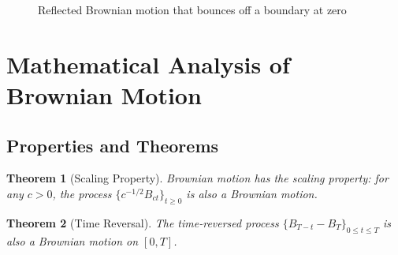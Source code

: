 \documentclass[12pt,a4paper,twoside]{article}
\newtheorem{theorem}{Theorem}[section]
\theoremstyle{definition}
\begin{document}
\begin{figure}[H]
\centering
{}
\caption{Reflected Brownian motion that bounces off a boundary at zero}
\label{fig:reflected-brownian}
\end{figure}

\section{Mathematical Analysis of Brownian Motion}

\subsection{Properties and Theorems}

\begin{theorem}[Scaling Property]
Brownian motion has the scaling property: for any $c > 0$, the process $\{c^{-1/2}B_{ct}\}_{t \geq 0}$ is also a Brownian motion.
\end{theorem}

\begin{theorem}[Time Reversal]
The time-reversed process $\{B_{T-t} - B_T\}_{0 \leq t \leq T}$ is also a Brownian motion on $[0,T]$.
\end{theorem}
\end{document}
